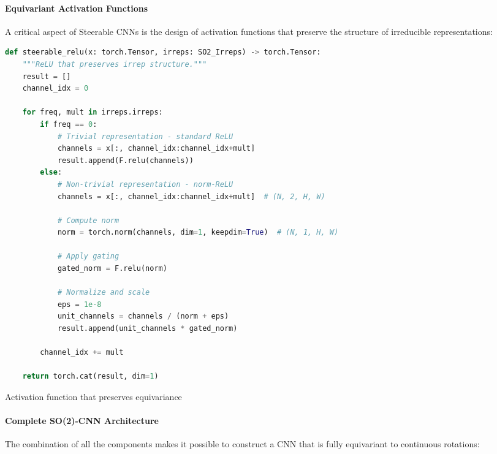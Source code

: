 \paragraph{Equivariant Activation Functions}

A critical aspect of Steerable CNNs is the design of activation functions that preserve the structure of irreducible representations:

\begin{listing}[h]
\begin{lstlisting}[language=Python]
def steerable_relu(x: torch.Tensor, irreps: SO2_Irreps) -> torch.Tensor:
    """ReLU that preserves irrep structure."""
    result = []
    channel_idx = 0

    for freq, mult in irreps.irreps:
        if freq == 0:
            # Trivial representation - standard ReLU
            channels = x[:, channel_idx:channel_idx+mult]
            result.append(F.relu(channels))
        else:
            # Non-trivial representation - norm-ReLU
            channels = x[:, channel_idx:channel_idx+mult]  # (N, 2, H, W)

            # Compute norm
            norm = torch.norm(channels, dim=1, keepdim=True)  # (N, 1, H, W)

            # Apply gating
            gated_norm = F.relu(norm)

            # Normalize and scale
            eps = 1e-8
            unit_channels = channels / (norm + eps)
            result.append(unit_channels * gated_norm)

        channel_idx += mult

    return torch.cat(result, dim=1)
\end{lstlisting}
\caption{Activation function that preserves equivariance}
\label{code:steerable_relu}
\end{listing}

\paragraph{Complete SO(2)-CNN Architecture}

The combination of all the components makes it possible to construct a CNN that is fully equivariant to continuous rotations:

